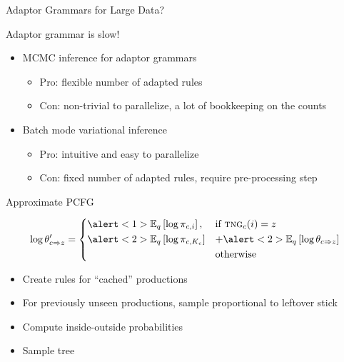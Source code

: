 \documentclass[compress]{beamer}
\newcommand{\tng}[1]{\mbox{\textsc{tng}}_{#1}}
\newcommand{\e}[2]{\mathbb{E}_{#1}\left[ #2 \right] }
\begin{document}
\begin{frame}{Adaptor Grammars for Large Data?}
  \vspace{-1mm}
  \begin{block}{Adaptor grammar is slow!}
    \begin{itemize}
    \item MCMC inference for adaptor grammars~\cite{johnson-06}
      \begin{itemize}
      \item Pro: flexible number of adapted rules
      \item Con: non-trivial to parallelize, a lot of bookkeeping on
        the counts
      \end{itemize}
    \item Batch mode variational inference~\cite{cohen-10}
      \begin{itemize}
      \item Pro: intuitive and easy to parallelize
      \item Con: fixed number of adapted rules, require pre-processing step
      \end{itemize}
    \end{itemize}
  \end{block}
\end{frame}

\begin{frame}{Approximate PCFG}

\begin{align}
   \log \theta'_{c \Rightarrow z} =
  \begin{dcases}
     \alert<1>{\e{q}{ \log \pi_{c, i} },} & \mbox{if $\tng{c}(i) = z$}  \\
     \alert<2> {\e{q}{\log \pi_{c, K_c}}} & + \alert<2>{\e{q}{\log \theta_{c \Rightarrow z} } } \\
    & \mbox{otherwise}
  \end{dcases}
  \label{eq:approx-pcfg}
\end{align}

\begin{itemize}
  \item \alert<1>{Create rules for ``cached'' productions}
  \item \alert<2>{For previously unseen productions, sample
      proportional to leftover stick}
  \item Compute inside-outside probabilities
  \item Sample tree~\cite{johnson-07}
\end{itemize}

\end{frame}
\end{document}
